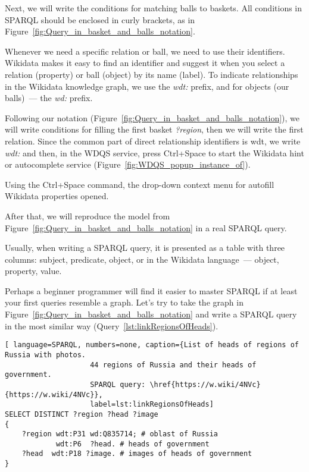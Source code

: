 Next, we will write the conditions for matching balls to baskets. All conditions in SPARQL should be enclosed in curly brackets, as in Figure~\ref{fig:Query_in_basket_and_balls_notation}.

Whenever we need a specific relation or ball, 
we need to use their identifiers. 
Wikidata makes it easy to find an identifier 
and suggest it when you select a relation (property) or ball (object) by its name (label). 
%
To indicate relationships in the Wikidata knowledge graph, we use the \textit{wdt:} prefix, and for objects (our balls)~--- the \textit{wd:} prefix. 

Following our notation (Figure~\ref{fig:Query_in_basket_and_balls_notation}), we will write conditions for filling the first basket \textit{?region}, then we will write the first relation. Since the common part of direct relationship identifiers is wdt, we write \textit{wdt:} and then, in the WDQS service, press Ctrl+Space to start the Wikidata hint or autocomplete service (Figure~\ref{fig:WDQS_popup_instance_of}). 

\begin{marginfigure}[-2cm]
	{
		\setlength{\fboxsep}{0pt}%
		\setlength{\fboxrule}{1pt}%
	}
    \caption{Using the Ctrl+Space command, the drop-down context menu for autofill Wikidata properties opened.}
	\label{fig:WDQS_popup_instance_of}
\end{marginfigure}

After that, we will reproduce the model from Figure~\ref{fig:Query_in_basket_and_balls_notation} in a real SPARQL query.

Usually, when writing a SPARQL query, it is presented as a table with three columns: subject, predicate, object, or in the Wikidata language~--- object, property, value.

Perhaps a beginner programmer will find it easier to master SPARQL if at least your first queries resemble a graph. Let's try to take the graph in Figure~\ref{fig:Query_in_basket_and_balls_notation} and write a SPARQL query in the most similar way (Query~\ref{lst:linkRegionsOfHeads}).

\begin{lstlisting}[ language=SPARQL, numbers=none, caption={List of heads of regions of Russia with photos. 
                    44 regions of Russia and their heads of government. 
                    SPARQL query: \href{https://w.wiki/4NVc}{https://w.wiki/4NVc}},
                    label=lst:linkRegionsOfHeads]
SELECT DISTINCT ?region ?head ?image
{
    ?region wdt:P31 wd:Q835714; # oblast of Russia
            wdt:P6  ?head. # heads of government
    ?head  wdt:P18 ?image. # images of heads of government
}
\end{lstlisting}

